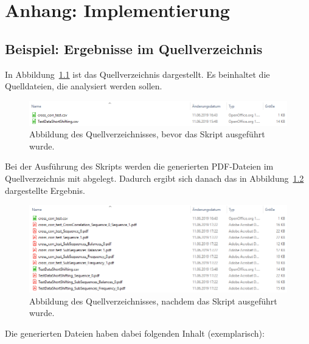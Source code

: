 \chapter{Anhang: Implementierung}
\section{Beispiel: Ergebnisse im Quellverzeichnis}
\label{attachement:python:results}
In Abbildung~\ref{fig:source_folder} ist das Quellverzeichnis dargestellt.
Es beinhaltet die Quelldateien, die analysiert werden sollen.
\begin{figure}[H]
	\includegraphics[width=\linewidth]{attachements/python/source_folder.PNG}
	\caption[Anhang: Quellverzeichnis vor der Ausführung]{Abbildung des Quellverzeichnisses, bevor das Skript ausgeführt wurde\footnotemark.}
	\label{fig:source_folder}
\end{figure}

Bei der Ausführung des Skripts werden die generierten PDF-Dateien im Quellverzeichnis mit abgelegt.
Dadurch ergibt sich danach das in Abbildung~\ref{fig:source_folder_results} dargestellte Ergebnis.
\begin{figure}[H]
	\includegraphics[width=\linewidth]{attachements/python/source_folder_result.PNG}
	\caption[Anhang: Quellverzeichnis nach der Ausführung]{Abbildung des Quellverzeichnisses, nachdem das Skript ausgeführt wurde\footnotemark.}
	\label{fig:source_folder_results}
\end{figure}

Die generierten Dateien haben dabei folgenden Inhalt (exemplarisch):

